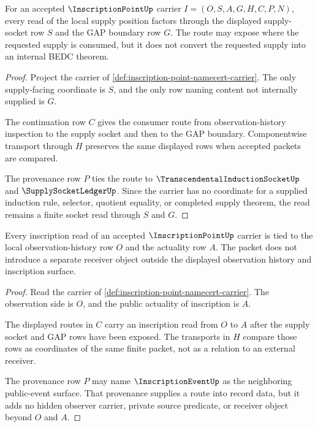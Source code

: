\begin{theorem}
\label{thm:inscription-point-local-supply-socket}
For an accepted $\InscriptionPointUp$ carrier $I=(O,S,A,G,H,C,P,N)$, every read of the local supply position factors through the displayed supply-socket row $S$ and the GAP boundary row $G$. The route may expose where the requested supply is consumed, but it does not convert the requested supply into an internal BEDC theorem.
\end{theorem}
\begin{proof}
Project the carrier of \autoref{def:inscription-point-namecert-carrier}. The only supply-facing coordinate is $S$, and the only row naming content not internally supplied is $G$.

The continuation row $C$ gives the consumer route from observation-history inspection to the supply socket and then to the GAP boundary. Componentwise transport through $H$ preserves the same displayed rows when accepted packets are compared.

The provenance row $P$ ties the route to $\TranscendentalInductionSocketUp$ and $\SupplySocketLedgerUp$. Since the carrier has no coordinate for a supplied induction rule, selector, quotient equality, or completed supply theorem, the read remains a finite socket read through $S$ and $G$.
\end{proof}

\begin{theorem}
\label{thm:inscription-point-observation-history-actuality}
Every inscription read of an accepted $\InscriptionPointUp$ carrier is tied to the local observation-history row $O$ and the actuality row $A$. The packet does not introduce a separate receiver object outside the displayed observation history and inscription surface.
\end{theorem}
\begin{proof}
Read the carrier of \autoref{def:inscription-point-namecert-carrier}. The observation side is $O$, and the public actuality of inscription is $A$.

The displayed routes in $C$ carry an inscription read from $O$ to $A$ after the supply socket and GAP rows have been exposed. The transports in $H$ compare those rows as coordinates of the same finite packet, not as a relation to an external receiver.

The provenance row $P$ may name $\InscriptionEventUp$ as the neighboring public-event surface. That provenance supplies a route into record data, but it adds no hidden observer carrier, private source predicate, or receiver object beyond $O$ and $A$.
\end{proof}

